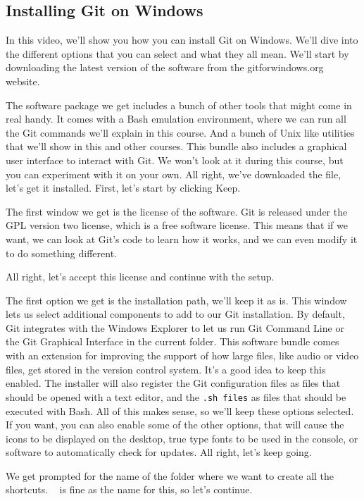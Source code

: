 	\subsection{Installing Git on Windows}
	
	
	In this video, we'll show you how you can install Git on Windows. We'll dive into the different options that you can select and what they all mean. We'll start by downloading the latest version of the software from the gitforwindows.org website.
	
	The software package we get includes a bunch of other tools that might come in real handy. It comes with a Bash emulation environment, where we can run all the Git commands we'll explain in this course. And a bunch of Unix like utilities that we'll show in this and other courses. This bundle also includes a graphical user interface to interact with Git. We won't look at it during this course, but you can experiment with it on your own. All right, we've downloaded the file, let's get it installed. First, let's start by clicking Keep.
	
	The first window we get is the license of the software. Git is released under the GPL version two license, which is a free software license. This means that if we want, we can look at Git's code to learn how it works, and we can even modify it to do something different.
	
	All right, let's accept this license and continue with the setup.
	
	The first option we get is the installation path, we'll keep it as is. This window lets us select additional components to add to our Git installation. By default, Git integrates with the Windows Explorer to let us run Git Command Line or the Git Graphical Interface in the current folder. This software bundle comes with an extension for improving the support of how large files, like audio or video files, get stored in the version control system. It's a good idea to keep this enabled. The installer will also register the Git configuration files as files that should be opened with a text editor, and the \verb|.sh files| as files that should be executed with Bash. All of this makes sense, so we'll keep these options selected. If you want, you can also enable some of the other options, that will cause the icons to be displayed on the desktop, true type fonts to be used in the console, or software to automatically check for updates. All right, let's keep going.
	
	We get prompted for the name of the folder where we want to create all the shortcuts. \texttt{ } is fine as the name for this, so let's continue.
	
